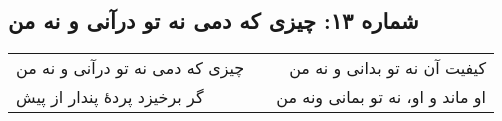 \begin{center}
\section*{شماره ۱۳: چیزی که دمی نه تو درآنی و نه من}
\label{sec:013}
\begin{longtable}{l p{0.5cm} r}
چیزی که دمی نه تو درآنی و نه من
&&
کیفیت آن نه تو بدانی و نه من
\\
گر برخیزد پردهٔ پندار از پیش
&&
او ماند و او، نه تو بمانی ونه من
\\
\end{longtable}
\end{center}
